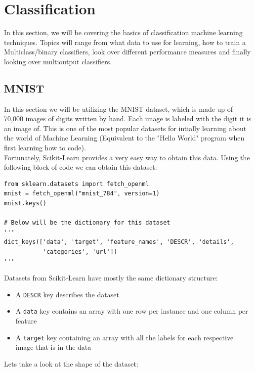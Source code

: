 
\section{Classification}

In this section, we will be covering the basics of classification machine learning techniques. Topics
will range from what data to use for learning, how to train a Multiclass/binary classifiers, 
look over different performance measures and finally looking over multioutput classifiers. 

\subsection{MNIST}

In this section we will be utilizing the MNIST dataset, which is made up of 70,000 images of digits
written by hand. Each image is labeled with the digit it is an image of. This is one of the most 
popular datasets for intially learning about the world of Machine Learning (Equivalent to the 
"Hello World" program when first learning how to code).\\

\noindent
Fortunately, Scikit-Learn provides a very easy way to obtain this data. Using the following block
of code we can obtain this dataset:

\begin{verbatim}
from sklearn.datasets import fetch_openml
mnist = fetch_openml("mnist_784", version=1)
mnist.keys()

# Below will be the dictionary for this dataset
'''
dict_keys(['data', 'target', 'feature_names', 'DESCR', 'details',
           'categories', 'url'])
'''
\end{verbatim}

\noindent
Datasets from Scikit-Learn have mostly the same dictionary structure:

\begin{itemize}
    \item A \texttt{DESCR} key describes the dataset
    \item A \texttt{data} key contains an array with one row per instance and one column
    per feature
    \item A \texttt{target} key containing an array with all the labels for each respective
    image that is in the data
\end{itemize}

\noindent
Lets take a look at the shape of the dataset:


